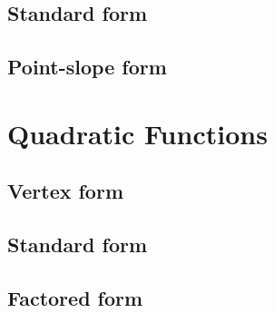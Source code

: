 \documentclass[11pt]{article}
\begin{document}
 \subsection{Standard form}
 \subsection{Point-slope form}
\section{Quadratic Functions}
 \subsection{Vertex form}
 \subsection{Standard form}
 \subsection{Factored form}
\end{document}

